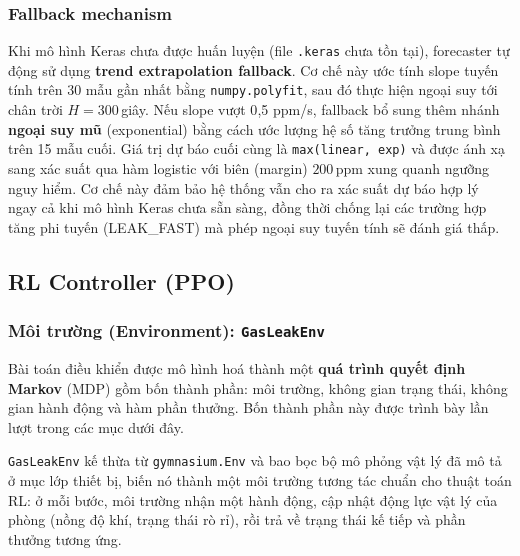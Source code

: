 \subsubsection{Fallback mechanism}

Khi mô hình Keras chưa được huấn luyện (file \texttt{.keras} chưa tồn tại), forecaster tự động sử dụng \textbf{trend extrapolation fallback}. Cơ chế này ước tính slope tuyến tính trên 30 mẫu gần nhất bằng \texttt{numpy.polyfit}, sau đó thực hiện ngoại suy tới chân trời $H=300$\,giây. Nếu slope vượt 0{,}5 ppm/s, fallback bổ sung thêm nhánh \textbf{ngoại suy mũ} (exponential) bằng cách ước lượng hệ số tăng trưởng trung bình trên 15 mẫu cuối. Giá trị dự báo cuối cùng là \texttt{max(linear, exp)} và được ánh xạ sang xác suất qua hàm logistic với biên (margin) $200$\,ppm xung quanh ngưỡng nguy hiểm. Cơ chế này đảm bảo hệ thống vẫn cho ra xác suất dự báo hợp lý ngay cả khi mô hình Keras chưa sẵn sàng, đồng thời chống lại các trường hợp tăng phi tuyến (LEAK\_FAST) mà phép ngoại suy tuyến tính sẽ đánh giá thấp.

\subsection{RL Controller (PPO)}

\subsubsection{Môi trường (Environment): \texttt{GasLeakEnv}}

Bài toán điều khiển được mô hình hoá thành một \textbf{quá trình quyết định Markov} (MDP) gồm bốn thành phần: môi trường, không gian trạng thái, không gian hành động và hàm phần thưởng. Bốn thành phần này được trình bày lần lượt trong các mục dưới đây.

\texttt{GasLeakEnv} kế thừa từ \texttt{gymnasium.Env} và bao bọc bộ mô phỏng vật lý đã mô tả ở mục lớp thiết bị, biến nó thành một môi trường tương tác chuẩn cho thuật toán RL: ở mỗi bước, môi trường nhận một hành động, cập nhật động lực vật lý của phòng (nồng độ khí, trạng thái rò rỉ), rồi trả về trạng thái kế tiếp và phần thưởng tương ứng.

